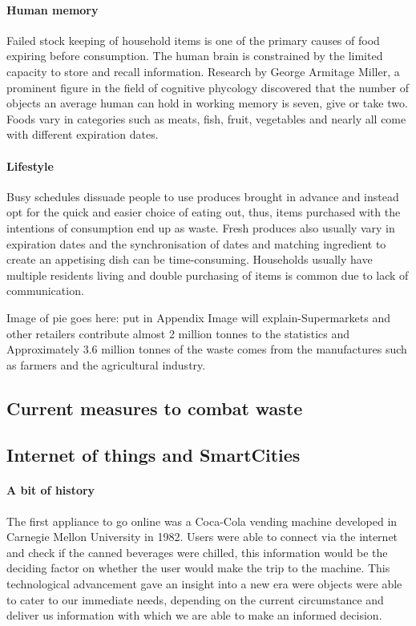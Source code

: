 \documentclass[a4paper, 11pt]{article}
\begin{document}
\paragraph{Human memory}Failed stock keeping of household items is one of the primary causes of food expiring before consumption. The human brain is constrained by the limited capacity to store and recall information. Research by George Armitage Miller, a prominent figure in the field of cognitive phycology discovered that the number of objects an average human can hold in working memory is seven, give or take two.\cite{2} Foods vary in categories such as meats, fish, fruit, vegetables and nearly all come with different expiration dates. 


\paragraph{Lifestyle}Busy schedules dissuade people to use produces brought in advance and instead opt for the quick and easier choice of eating out, thus, items purchased with the intentions of consumption end up as waste. Fresh produces also usually vary in expiration dates and the synchronisation of dates and matching ingredient to create an appetising dish can be time-consuming. Households usually have multiple residents living and double purchasing of items is common due to lack of communication. 

\vspace{\baselineskip}
Image of pie goes here: put in Appendix Image will explain-Supermarkets and other retailers contribute almost 2 million tonnes to the statistics and Approximately 3.6 million tonnes of the waste comes from the manufactures such as farmers and the agricultural industry.


\subsection{Current measures to combat waste}

\subsection{Internet of things and SmartCities}
\paragraph{A bit of history} The first appliance to go online was a Coca-Cola vending machine developed in Carnegie Mellon University in 1982. Users were able to connect via the internet and check if the canned beverages were chilled, this information would be the deciding factor on whether the user would make the trip to the machine. This technological advancement gave an insight into a new era were objects were able to cater to our immediate needs, depending on the current circumstance and deliver us information with which we are able to make an informed decision.
\end{document}

